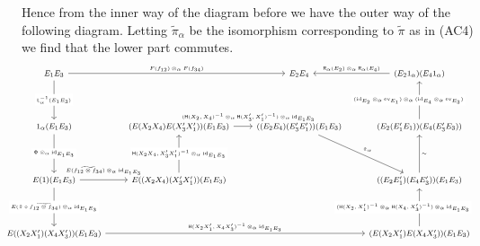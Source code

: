 \begin{prf}
\begin{enumerate}
Hence from the inner way of the diagram before we have the outer way of the following diagram. Letting $\tilde{\pi}_{\alpha}$ be the isomorphism corresponding to $\tilde{\pi}$ as in (AC4) we find that the lower part commutes.
\begin{equation*}
\hspace{-2em}
\begin{tikzcd}[row sep=4em,column sep=2em,font=\footnotesize,every label/.append style={font=\tiny}]
  E_{1} E_{3}
  \ar{rr}{F(f_{12}) \otimes_{\alpha} F(f_{34})}
  \ar{d}[description]{\mathsf{L}_{\alpha}^{-1}(E_{1} E_{3})}
  &
  &
  E_{2} E_{4}
  &
  (E_{2} 1_{\alpha}) (E_{4} 1_{\alpha})
  \ar{l}[swap]{\mathsf{R}_{\alpha}(E_{2}) \otimes_{\alpha} \mathsf{R}_{\alpha}(E_{4})}
  \\
  1_{\alpha} (E_{1} E_{3})
  \ar{d}[description]{\Phi \otimes_{\alpha} \mathrm{id}_{E_{1} E_{3}}}
  &
  (E(X_{2} X_{4}) E(X_{3}^{\prime} X_{1}^{\prime})) (E_{1} E_{3})
  \ar{r}[xshift=2mm,yshift=3pt]{(\mathsf{H}(X_{2},X_{4})^{-1} \otimes_{\alpha} \mathsf{H}(X_{3}^{\prime},X_{1}^{\prime})^{-1}) \otimes_{\alpha} \mathrm{id}_{E_{1} E_{3}}}
  &
  ((E_{2} E_{4}) (E_{3}^{\prime} E_{1}^{\prime})) (E_{1} E_{3})
  \ar{rd}{\tilde{\pi}_{\alpha}}
  &
  (E_{2} (E_{1}^{\prime} E_{1})) (E_{4} (E_{3}^{\prime} E_{3}))
  \ar{u}[description,xshift=-4mm]{(\mathrm{id}_{E_{2}} \otimes_{\alpha} \mathrm{ev}_{E_{1}}) \otimes_{\alpha} (\mathrm{id}_{E_{4}} \otimes_{\alpha} \mathrm{ev}_{E_{3}})}
  \\
  E(1) (E_{1} E_{3})
  \ar{r}[yshift=3pt]{E(\widetilde{f_{12} \otimes f_{34}}) \otimes_{\alpha} \mathrm{id}_{E_{1} E_{3}}}
  \ar{d}[description]{E(\tilde{\pi} \circ \widetilde{f_{12} \otimes f_{34}}) \otimes_{\alpha} \mathrm{id}_{E_{1} E_{3}}}
  &
  E((X_{2} X_{4}) (X_{3}^{\prime} X_{1}^{\prime})) (E_{1} E_{3})
  \ar{u}[description]{\mathsf{H}(X_{2} X_{4},X_{3}^{\prime} X_{1}^{\prime})^{-1} \otimes_{\alpha} \mathrm{id}_{E_{1} E_{3}}}
  &
  &
  ((E_{2} E_{1}^{\prime}) (E_{4} E_{3}^{\prime})) (E_{1} E_{3})
  \ar{u}[swap]{\sim}
  \\
  E((X_{2} X_{1}^{\prime}) (X_{4} X_{3}^{\prime})) (E_{1} E_{3})
  \ar{rrr}{\mathsf{H}(X_{2} X_{1}^{\prime},X_{4} X_{3}^{\prime})^{-1} \otimes_{\alpha} \mathrm{id}_{E_{1} E_{3}}}
  &
  &
  &
  (E(X_{2} X_{1}^{\prime}) E(X_{4} X_{3}^{\prime})) (E_{1} E_{3})
  \ar{u}[description,xshift=-6mm]{(\mathsf{H}(X_{2},X_{1}^{\prime})^{-1} \otimes_{\alpha} \mathsf{H}(X_{4},X_{3}^{\prime})^{-1}) \otimes_{\alpha} \mathrm{id}_{E_{1} E_{3}}}
\end{tikzcd}
\end{equation*}

\end{enumerate}
\end{prf}
